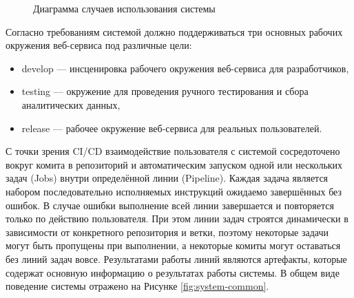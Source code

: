 \begin{figure}[h!]
    \centering
    \caption{Диаграмма случаев использования системы}
    \label{fig:use-cases}
\end{figure}

Согласно требованиям системой должно поддерживаться три основных рабочих окружения веб-сервиса под различные цели:

\begin{itemize}
    \item develop --- инсценировка рабочего окружения веб-сервиса для разработчиков,
    \item testing --- окружение для проведения ручного тестирования и сбора аналитических данных,
    \item release --- рабочее окружение веб-сервиса для реальных пользователей.
\end{itemize}

С точки зрения CI/CD взаимодействие пользователя с системой сосредоточено вокруг комита в репозиторий и автоматическим запуском
одной или нескольких задач (Jobs) внутри определённой линии (Pipeline).
Каждая задача является набором последовательно исполняемых инструкций ожидаемо завершённых без ошибок.
В случае ошибки выполнение всей линии завершается и повторяется только по действию пользователя.
При этом линии задач строятся динамически в зависимости от конкретного репозитория и ветки, поэтому некоторые задачи могут быть пропущены при выполнении,
а некоторые комиты могут оставаться без линий задач вовсе.
Результатами работы линий являются артефакты, которые содержат основную информацию о результатах работы системы.
В общем виде поведение системы отражено на Рисунке \ref{fig:system-common}.

